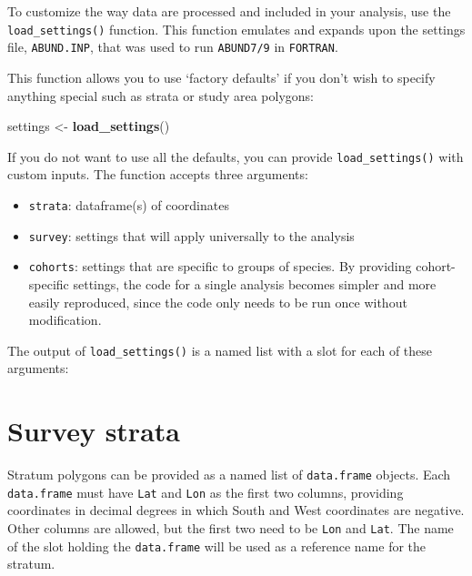 \documentclass[
]{book}
\newenvironment{Shaded}{\begin{snugshade}}{\end{snugshade}}
\newcommand{\DecValTok}[1]{\textcolor[rgb]{0.00,0.00,0.81}{#1}}
\newcommand{\KeywordTok}[1]{\textcolor[rgb]{0.13,0.29,0.53}{\textbf{#1}}}
\newcommand{\NormalTok}[1]{#1}
\newcommand{\OperatorTok}[1]{\textcolor[rgb]{0.81,0.36,0.00}{\textbf{#1}}}
\newcommand{\StringTok}[1]{\textcolor[rgb]{0.31,0.60,0.02}{#1}}
\begin{document}
To customize the way data are processed and included in your analysis, use the \texttt{load\_settings()} function. This function emulates and expands upon the settings file, \texttt{ABUND.INP}, that was used to run \texttt{ABUND7/9} in \texttt{FORTRAN}.

This function allows you to use `factory defaults' if you don't wish to specify anything special such as strata or study area polygons:

\begin{Shaded}
\begin{Highlighting}[]
\NormalTok{settings <-}\StringTok{ }\KeywordTok{load_settings}\NormalTok{()}
\end{Highlighting}
\end{Shaded}

If you do not want to use all the defaults, you can provide \texttt{load\_settings()} with custom inputs. The function accepts three arguments:

\begin{itemize}
\item
  \texttt{strata}: dataframe(s) of coordinates
\item
  \texttt{survey}: settings that will apply universally to the analysis
\item
  \texttt{cohorts}: settings that are specific to groups of species. By providing cohort-specific settings, the code for a single analysis becomes simpler and more easily reproduced, since the code only needs to be run once without modification.
\end{itemize}

The output of \texttt{load\_settings()} is a named list with a slot for each of these arguments:

\begin{Shaded}
\end{Shaded}

\hypertarget{survey-strata}{%
\section*{Survey strata}\label{survey-strata}}

Stratum polygons can be provided as a named list of \texttt{data.frame} objects. Each \texttt{data.frame} must have \texttt{Lat} and \texttt{Lon} as the first two columns, providing coordinates in decimal degrees in which South and West coordinates are negative. Other columns are allowed, but the first two need to be \texttt{Lon} and \texttt{Lat}. The name of the slot holding the \texttt{data.frame} will be used as a reference name for the stratum.
\end{document}
